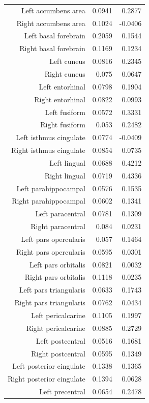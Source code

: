 \documentclass{article}
\begin{document}
\begin{table}[h]
\begin{centering}
\begin{tabular}{|r|r|r|}
      Left accumbens area & 0.0941 & 0.2877 \\
      Right accumbens area & 0.1024 & -0.0406 \\
      Left basal forebrain & 0.2059 & 0.1544 \\
      Right basal forebrain & 0.1169 & 0.1234 \\
      Left cuneus & 0.0816 & 0.2345 \\
      Right cuneus & 0.075 & 0.0647 \\
      Left entorhinal & 0.0798 & 0.1904 \\
      Right entorhinal & 0.0822 & 0.0993 \\
      Left fusiform & 0.0572 & 0.3331 \\
      Right fusiform & 0.053 & 0.2482 \\
      Left isthmus cingulate & 0.0774 & -0.0409 \\
      Right isthmus cingulate & 0.0854 & 0.0735 \\
      Left lingual & 0.0688 & 0.4212 \\
      Right lingual & 0.0719 & 0.4336 \\
      Left parahippocampal & 0.0576 & 0.1535 \\
      Right parahippocampal & 0.0602 & 0.1341 \\
      Left paracentral & 0.0781 & 0.1309 \\
      Right paracentral & 0.084 & 0.0231 \\
      Left pars opercularis & 0.057 & 0.1464 \\
      Right pars opercularis & 0.0595 & 0.0301 \\
      Left pars orbitalis & 0.0821 & 0.0032 \\
      Right pars orbitalis & 0.1118 & 0.0235 \\
      Left pars triangularis & 0.0633 & 0.1743 \\
      Right pars triangularis & 0.0762 & 0.0434 \\
      Left pericalcarine & 0.1105 & 0.1997 \\
      Right pericalcarine & 0.0885 & 0.2729 \\
      Left postcentral & 0.0516 & 0.1681 \\
      Right postcentral & 0.0595 & 0.1349 \\
      Left posterior cingulate & 0.1338 & 0.1365 \\
      Right posterior cingulate & 0.1394 & 0.0628 \\
      Left precentral & 0.0654 & 0.2478 \\

\end{tabular}
\end{centering}
\end{table}
\end{document}
